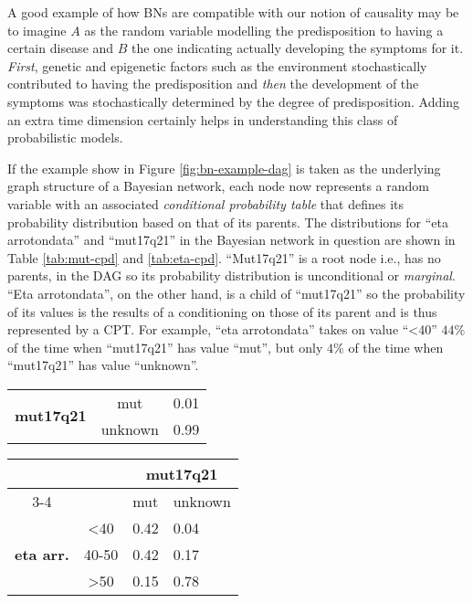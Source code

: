 A good example of how BNs are compatible with our notion of causality may be to imagine $A$ as the random variable modelling the predisposition to having a certain disease and $B$ the one indicating actually developing the symptoms for it.
\textit{First}, genetic and epigenetic factors such as the environment stochastically contributed to having the predisposition and \textit{then} the development of the symptoms was stochastically determined by the degree of predisposition.
Adding an extra time dimension certainly helps in understanding this class of probabilistic models.

If the example show in Figure \ref{fig:bn-example-dag} is taken as the underlying graph structure of a Bayesian network, each node now represents a random variable with an associated \textit{conditional probability table} that defines its probability distribution based on that of its parents.
The distributions for \enquote{eta arrotondata} and \enquote{mut17q21} in the Bayesian network in question are shown in Table \ref{tab:mut-cpd} and \ref{tab:eta-cpd}.
\enquote{Mut17q21} is a root node i.e., has no parents, in the DAG so its probability distribution is unconditional or \textit{marginal}.
\enquote{Eta arrotondata}, on the other hand, is a child of \enquote{mut17q21} so the probability of its values is the results of a conditioning on those of its parent and is thus represented by a CPT.
For example, \enquote{eta arrotondata} takes on value \enquote{<40} $44\%$ of the time when \enquote{mut17q21} has value \enquote{mut}, but only $4\%$ of the time when \enquote{mut17q21} has value \enquote{unknown}.

\begin{table*}[htbp]
\centering
\caption{\enquote{mut17q21} mass function}
\begin{tabularx}{0.5\textwidth}{ccX}
\toprule
 \multirow{2}{*}{\textbf{mut17q21}} & mut & 0.01  \\
 & unknown & 0.99 \\
\bottomrule
\end{tabularx}
\label{tab:mut-cpd}
\end{table*}

\begin{table*}[htbp]
\centering
\caption{\enquote{eta arrotondata} CPT}
\begin{tabularx}{0.5\textwidth}{ccXX}
\toprule
      & &  \multicolumn{2}{c}{\textbf{mut17q21}} \\
\cmidrule(lr){3-4}
 & & mut & unknown    \\ 
 \multirow{3}{*}{\textbf{eta arr.}}  & <40 & 0.42 & 0.04  \\
 & 40-50 & 0.42 & 0.17    \\
 & >50 & 0.15 & 0.78 \\
\bottomrule
\end{tabularx}
\label{tab:eta-cpd}
\end{table*}

